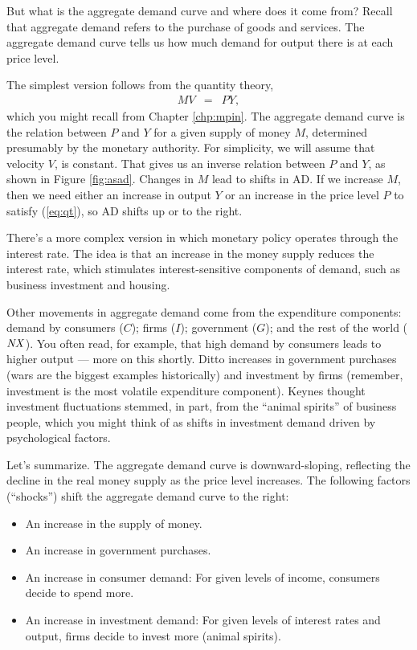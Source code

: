 But what is the aggregate demand curve and where does it come from?
Recall that aggregate demand refers to the purchase of goods and services.
The aggregate demand curve tells us how much demand for output
there is at each price level.

The simplest version follows from the quantity theory,
\begin{eqnarray}
    M V &=& P Y ,
    \label{eq:qt}
\end{eqnarray}
which you might recall from Chapter \ref{chp:mpin}.
The aggregate demand curve is the relation between $P$ and $Y$ for a
given supply of money $M$,
determined presumably by the monetary authority.
For simplicity, we will assume that velocity $V$, is constant.
That gives us an inverse relation between $P$ and $Y$,
as shown in Figure \ref{fig:asad}.
Changes in $M$ lead to shifts in AD.
If we increase $M$, then we need either an increase in output $Y$
or an increase in the price level $P$ to satisfy (\ref{eq:qt}),
so AD shifts up or to the right.

There's a more complex version in which monetary policy operates
through the interest rate.
The idea is that an increase in the money supply reduces
the interest rate,
which stimulates interest-sensitive components of demand,
such as business investment and housing.

Other movements in aggregate demand come from the expenditure components:
demand by consumers ($C$); firms ($I$); government ($G$);
and the rest of the world ($\mbox{\em NX\/}$).
You often read, for example, that high demand by consumers
leads to higher output --- more on this shortly.
Ditto increases in government purchases
(wars are the biggest examples historically)
and investment by firms (remember, investment is the most volatile
expenditure component).
Keynes thought investment fluctuations stemmed,
in part, from the ``animal spirits'' of business people,
which you might think of as shifts in investment demand
driven by psychological factors.



Let's summarize.
The aggregate demand curve is downward-sloping, reflecting
the decline in the real money supply as the price level increases.
The following factors (``shocks'')
shift the aggregate demand curve to the right:
%
\begin{itemize}
\item An increase in the supply of money.
\item An increase in government purchases.
\item An increase in consumer demand:  For given levels of income,
consumers decide to spend more.
\item An increase in investment demand:
For given levels of interest rates and output,
firms decide to invest more (animal spirits).
\end{itemize}

